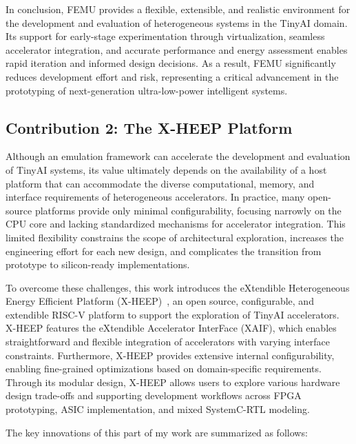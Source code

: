             In conclusion, \mbox{FEMU} provides a flexible, extensible, and realistic environment for the development and evaluation of heterogeneous systems in the TinyAI domain. Its support for early-stage experimentation through virtualization, seamless accelerator integration, and accurate performance and energy assessment enables rapid iteration and informed design decisions. As a result, \mbox{FEMU} significantly reduces development effort and risk, representing a critical advancement in the prototyping of next-generation ultra-low-power intelligent systems.
            
        \subsection*{Contribution 2: The X-HEEP Platform}
            
            Although an emulation framework can accelerate the development and evaluation of TinyAI systems, its value ultimately depends on the availability of a host platform that can accommodate the diverse computational, memory, and interface requirements of heterogeneous accelerators. In practice, many open-source platforms provide only minimal configurability, focusing narrowly on the CPU core and lacking standardized mechanisms for accelerator integration. This limited flexibility constrains the scope of architectural exploration, increases the engineering effort for each new design, and complicates the transition from prototype to silicon-ready implementations.
            
            To overcome these challenges, this work introduces the eXtendible Heterogeneous Energy Efficient Platform (\mbox{X-HEEP})~\cite{x-heep}, an open source, configurable, and extendible RISC-V platform to support the exploration of TinyAI accelerators. \mbox{X-HEEP} features the eXtendible Accelerator InterFace (XAIF), which enables straightforward and flexible integration of accelerators with varying interface constraints. Furthermore, \mbox{X-HEEP} provides extensive internal configurability, enabling fine-grained optimizations based on domain-specific requirements. Through its modular design, \mbox{X-HEEP} allows users to explore various hardware design trade-offs and supporting development workflows across FPGA prototyping, ASIC implementation, and mixed SystemC-RTL modeling.
        
            The key innovations of this part of my work are summarized as follows:

